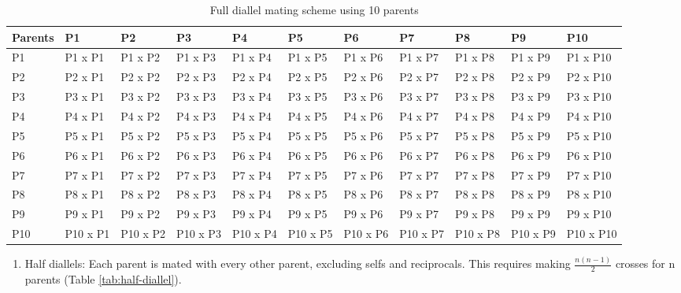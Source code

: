 \documentclass[nofonts,]{tufte-handout}
\providecommand{\tightlist}{%
  \setlength{\itemsep}{0pt}\setlength{\parskip}{0pt}}
\begin{document}
\begin{longtable}[t]{>{\raggedright\arraybackslash}p{3.5em}>{\raggedright\arraybackslash}p{3.5em}>{\raggedright\arraybackslash}p{3.5em}>{\raggedright\arraybackslash}p{3.5em}>{\raggedright\arraybackslash}p{3.5em}>{\raggedright\arraybackslash}p{3.5em}>{\raggedright\arraybackslash}p{3.5em}>{\raggedright\arraybackslash}p{3.5em}>{\raggedright\arraybackslash}p{3.5em}>{\raggedright\arraybackslash}p{3.5em}>{\raggedright\arraybackslash}p{3.5em}}
\caption{\label{tab:full-diallel}Full diallel mating scheme using 10 parents}\\
\toprule
Parents & P1 & P2 & P3 & P4 & P5 & P6 & P7 & P8 & P9 & P10\\
\midrule
\rowcolor{gray!6}  P1 & P1 x P1 & P1 x P2 & P1 x P3 & P1 x P4 & P1 x P5 & P1 x P6 & P1 x P7 & P1 x P8 & P1 x P9 & P1 x P10\\
P2 & P2 x P1 & P2 x P2 & P2 x P3 & P2 x P4 & P2 x P5 & P2 x P6 & P2 x P7 & P2 x P8 & P2 x P9 & P2 x P10\\
\rowcolor{gray!6}  P3 & P3 x P1 & P3 x P2 & P3 x P3 & P3 x P4 & P3 x P5 & P3 x P6 & P3 x P7 & P3 x P8 & P3 x P9 & P3 x P10\\
P4 & P4 x P1 & P4 x P2 & P4 x P3 & P4 x P4 & P4 x P5 & P4 x P6 & P4 x P7 & P4 x P8 & P4 x P9 & P4 x P10\\
\rowcolor{gray!6}  P5 & P5 x P1 & P5 x P2 & P5 x P3 & P5 x P4 & P5 x P5 & P5 x P6 & P5 x P7 & P5 x P8 & P5 x P9 & P5 x P10\\
\addlinespace
P6 & P6 x P1 & P6 x P2 & P6 x P3 & P6 x P4 & P6 x P5 & P6 x P6 & P6 x P7 & P6 x P8 & P6 x P9 & P6 x P10\\
\rowcolor{gray!6}  P7 & P7 x P1 & P7 x P2 & P7 x P3 & P7 x P4 & P7 x P5 & P7 x P6 & P7 x P7 & P7 x P8 & P7 x P9 & P7 x P10\\
P8 & P8 x P1 & P8 x P2 & P8 x P3 & P8 x P4 & P8 x P5 & P8 x P6 & P8 x P7 & P8 x P8 & P8 x P9 & P8 x P10\\
\rowcolor{gray!6}  P9 & P9 x P1 & P9 x P2 & P9 x P3 & P9 x P4 & P9 x P5 & P9 x P6 & P9 x P7 & P9 x P8 & P9 x P9 & P9 x P10\\
P10 & P10 x P1 & P10 x P2 & P10 x P3 & P10 x P4 & P10 x P5 & P10 x P6 & P10 x P7 & P10 x P8 & P10 x P9 & P10 x P10\\
\bottomrule
\end{longtable}
\endgroup{}

\begin{enumerate}
\def\labelenumi{\arabic{enumi}.}
\setcounter{enumi}{1}
\tightlist
\item
  Half diallels: Each parent is mated with every other parent, excluding
  selfs and reciprocals. This requires making \(\frac{n(n-1)}{2}\)
  crosses for n parents (Table \ref{tab:half-diallel}).
\end{enumerate}
\end{document}
